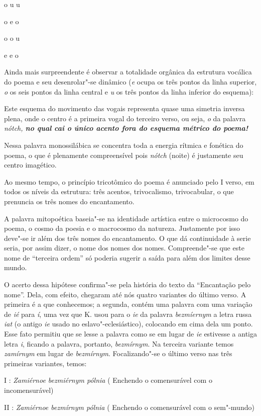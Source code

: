 o u u

o e o

o o u

e e o

Ainda mais surpreendente é observar a totalidade orgânica da estrutura
vocálica do poema e seu desenrolar"-se dinâmico (\emph{e} ocupa os três
pontos da linha superior, \emph{o} os seis pontos da linha central e
\emph{u} os três pontos da linha inferior do esquema):

Este esquema do movimento das vogais representa quase uma simetria
inversa plena, onde o centro é a primeira vogal do terceiro verso, ou
seja, \emph{o} da palavra \emph{nótch, \textbf{no qual cai o único
acento fora do esquema métrico do poema!}}

Nessa palavra monossilábica se concentra toda a energia rítmica e
fonética do poema, o que é plenamente compreensível pois \emph{nótch}
(noite) é justamente seu centro imagético.

Ao mesmo tempo, o princípio tricotômico do poema é anunciado pelo I
verso, em todos os níveis da estrutura: três acentos, trivocalismo,
trivocabular, o que prenuncia os três nomes do encantamento.

A palavra mitopoética baseia"-se na identidade artística entre o
microcosmo do poema, o cosmo da poesia e o macrocosmo da natureza.
Justamente por isso deve"-se ir além dos três nomes do encantamento. O
que dá continuidade à serie seria, por assim dizer, o nome dos nomes dos
nomes. Compreende"-se que este nome de ``terceira ordem'' só poderia
sugerir a saída para além dos limites desse mundo.

O acerto dessa hipótese confirma"-se pela história do texto da
``Encantação pelo nome''. Dela, com efeito, chegaram até nós quatro
variantes do último verso. A primeira é a que conhecemos; a segunda,
contém uma palavra com uma variação de \emph{ié} para \emph{í}, uma vez
que K. usou para o \emph{{ie}} da palavra \emph{bezm{íe}rnym} a letra
russa \emph{iat} (o antigo \emph{ie} usado no eslavo"-eclesiástico),
colocando em cima dela um ponto. Esse fato permitiu que se lesse a
palavra como se em lugar de \emph{{ie}} estivesse a antiga letra
\emph{i}, ficando a palavra, portanto, \emph{bezmírnym}. Na terceira
variante temos \emph{zamírnym} em lugar de \emph{bezmírnym}.
Focalizando"-se o último verso nas três primeiras variantes, temos:

I : \emph{Zamiérnoe bezmiérnym pólnia} ( Enchendo o comensurável com o
incomensurável)

II : \emph{Zamiérnoe bezmírnym pólnia} ( Enchendo o comensurável com o
sem"-mundo)

